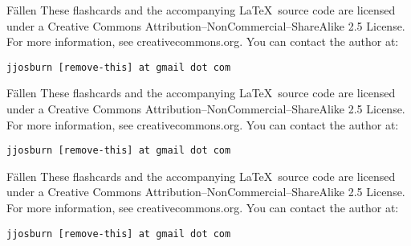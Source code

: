 \documentclass[avery5371,grid]{flashcards}
\begin{document}
\begin{flashcard}[Verb]{\Huge Fällen}
{\large These flashcards and the accompanying \LaTeX \, source code are licensed
under a Creative Commons Attribution--NonCommercial--ShareAlike 2.5 License.  
For more information, see creativecommons.org.  You can contact the author at: }
\begin{center}
\begin{small}\tt jjosburn [remove-this] at gmail dot com\end{small}
\end{center}
\end{flashcard}

\begin{flashcard}[Verb]{\Huge Fällen}
{\large These flashcards and the accompanying \LaTeX \, source code are licensed
under a Creative Commons Attribution--NonCommercial--ShareAlike 2.5 License.  
For more information, see creativecommons.org.  You can contact the author at: }
\begin{center}
\begin{small}\tt jjosburn [remove-this] at gmail dot com\end{small}
\end{center}
\end{flashcard}

\begin{flashcard}[Verb]{\Huge Fällen}
{\large These flashcards and the accompanying \LaTeX \, source code are licensed
under a Creative Commons Attribution--NonCommercial--ShareAlike 2.5 License.  
For more information, see creativecommons.org.  You can contact the author at: }
\begin{center}
\begin{small}\tt jjosburn [remove-this] at gmail dot com\end{small}
\end{center}
\end{flashcard}
\end{document}
